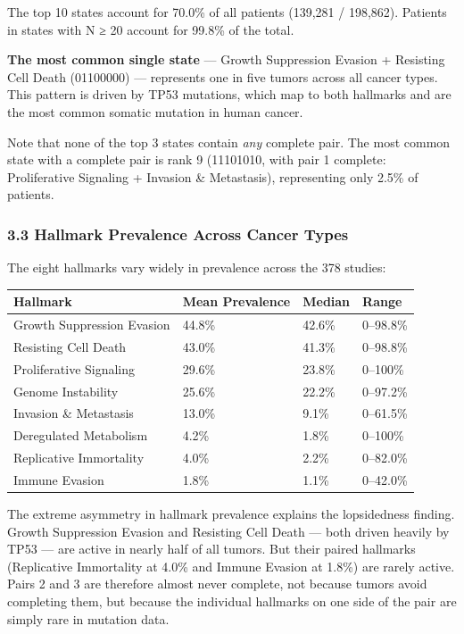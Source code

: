 \documentclass[
  11pt,
]{article}
\newcounter{none} %
\begin{document}
The top 10 states account for 70.0\% of all patients (139,281 /
198,862). Patients in states with N ≥ 20 account for 99.8\% of the
total.

\textbf{The most common single state} --- Growth Suppression Evasion +
Resisting Cell Death (01100000) --- represents one in five tumors across
all cancer types. This pattern is driven by TP53 mutations, which map to
both hallmarks and are the most common somatic mutation in human cancer.

Note that none of the top 3 states contain \emph{any} complete pair. The
most common state with a complete pair is rank 9 (11101010, with pair 1
complete: Proliferative Signaling + Invasion \& Metastasis),
representing only 2.5\% of patients.

\subsubsection{3.3 Hallmark Prevalence Across Cancer
Types}\label{hallmark-prevalence-across-cancer-types}

The eight hallmarks vary widely in prevalence across the 378 studies:

{\def\LTcaptype{none} %
\begin{longtable}[]{@{}llll@{}}
\toprule\noalign{}
Hallmark & Mean Prevalence & Median & Range \\
\midrule\noalign{}
\endhead
\bottomrule\noalign{}
\endlastfoot
Growth Suppression Evasion & 44.8\% & 42.6\% & 0--98.8\% \\
Resisting Cell Death & 43.0\% & 41.3\% & 0--98.8\% \\
Proliferative Signaling & 29.6\% & 23.8\% & 0--100\% \\
Genome Instability & 25.6\% & 22.2\% & 0--97.2\% \\
Invasion \& Metastasis & 13.0\% & 9.1\% & 0--61.5\% \\
Deregulated Metabolism & 4.2\% & 1.8\% & 0--100\% \\
Replicative Immortality & 4.0\% & 2.2\% & 0--82.0\% \\
Immune Evasion & 1.8\% & 1.1\% & 0--42.0\% \\
\end{longtable}
}

The extreme asymmetry in hallmark prevalence explains the lopsidedness
finding. Growth Suppression Evasion and Resisting Cell Death --- both
driven heavily by TP53 --- are active in nearly half of all tumors. But
their paired hallmarks (Replicative Immortality at 4.0\% and Immune
Evasion at 1.8\%) are rarely active. Pairs 2 and 3 are therefore almost
never complete, not because tumors avoid completing them, but because
the individual hallmarks on one side of the pair are simply rare in
mutation data.
\end{document}
